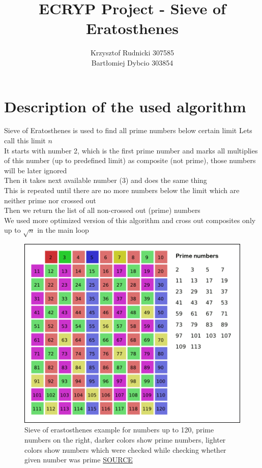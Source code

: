 \documentclass[12pt]{article}
\title{ECRYP Project - Sieve of Eratosthenes}
\author{Krzysztof Rudnicki 307585 \\ Bartłomiej Dybcio 303854}
\begin{document}
\maketitle
\section{Description of the used algorithm}
Sieve of Eratosthenes is used to find all prime numbers below certain limit Lets call this limit $n$ \\ 
It starts with number 2, which is the first prime number and marks all multiplies of this number (up to predefined limit) as composite (not prime), those numbers will be later ignored \\ 
Then it takes next available number (3) and does the same thing \\ 
This is repeated until there are no more numbers below the limit which are neither prime nor crossed out \\ 
Then we return the list of all non-crossed out (prime) numbers \\ 
We used more optimized version of this algorithm and cross out composites only up to $\sqrt{n}$ in the main loop \\ 
\begin{figure}[H]
    \caption{Sieve of erastosthenes example for numbers up to 120, prime numbers on the right, darker colors show prime numbers, lighter colors show numbers which were checked while checking whether given number was prime \href{https://en.wikipedia.org/wiki/Sieve_of_Eratosthenes}{SOURCE} }
\centering
\includegraphics{screenshoot/algorithm_description.png}
\end{figure}
\end{document}
